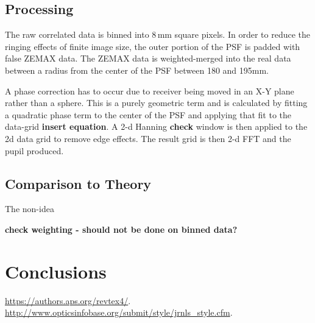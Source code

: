 \documentclass[osajnl,twocolumn,showpacs,superscriptaddress,11pt]{revtex4-1} %
\begin{document}
\subsection{Processing}

The raw correlated data is binned into 8\,mm square pixels. In order to reduce the ringing effects of finite image size, the outer portion of the PSF is padded with false ZEMAX data.  The ZEMAX data is weighted-merged into the real data between a radius from the center of the PSF between 180 and 195mm.

A phase correction has to occur due to receiver being moved in an X-Y plane rather than a sphere.  This is a purely geometric term and is calculated by fitting a quadratic phase term to the center of the PSF and applying that fit to the data-grid {\bf insert equation}. A 2-d Hanning {\bf check} window is then applied to the 2d data grid to remove edge effects.  The result grid is then 2-d FFT and the pupil produced. 

\subsection{Comparison to Theory}

The non-idea

{\bf check weighting - should not be done on binned data?}

\section{Conclusions}

\begin{thebibliography}{99}

 \url{https://authors.aps.org/revtex4/}.
 \url{http://www.opticsinfobase.org/submit/style/jrnls_style.cfm}.

\end{thebibliography}
\end{document}
